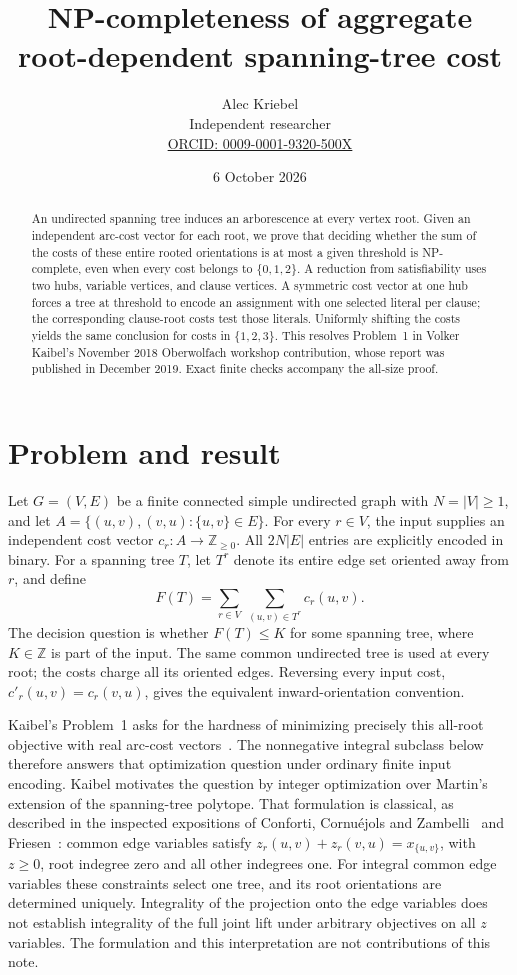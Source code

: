 \documentclass[11pt]{article}
\title{NP-completeness of aggregate root-dependent spanning-tree cost}
\author{Alec Kriebel\\Independent researcher\\
\small\href{https://orcid.org/0009-0001-9320-500X}{ORCID: 0009-0001-9320-500X}}
\date{6 October 2026}
\begin{document}
\maketitle
\begin{abstract}
An undirected spanning tree induces an arborescence at every vertex root.
Given an independent arc-cost vector for each root, we prove that deciding
whether the sum of the costs of these entire rooted orientations is at most
a given threshold is NP-complete, even when every cost belongs to
$\{0,1,2\}$. A reduction from satisfiability uses two hubs, variable vertices,
and clause vertices. A symmetric cost vector at one hub forces a tree at
threshold to encode an assignment with one selected literal per clause;
the corresponding clause-root costs test those literals. Uniformly shifting
the costs yields the same conclusion for costs in $\{1,2,3\}$. This resolves
Problem~1 in Volker Kaibel's November 2018 Oberwolfach workshop contribution,
whose report was published in December 2019. Exact finite checks accompany
the all-size proof.
\end{abstract}

\section{Problem and result}
Let $G=(V,E)$ be a finite connected simple undirected graph with
$N=|V|\geq 1$, and let
$A=\{(u,v),(v,u):\{u,v\}\in E\}$. For every $r\in V$, the input supplies
an independent cost vector $c_r:A\to\mathbb Z_{\geq0}$. All
$2N|E|$ entries are explicitly encoded in binary. For a spanning tree $T$,
let $T^r$ denote its entire edge set oriented away from $r$, and define
\begin{equation}\label{eq:objective}
 F(T)=\sum_{r\in V}\ \sum_{(u,v)\in T^r}c_r(u,v).
\end{equation}
The decision question is whether $F(T)\leq K$ for some spanning tree, where
$K\in\mathbb Z$ is part of the input. The same common undirected tree
is used at every root; the costs charge all its oriented edges.
Reversing every input cost, $c'_r(u,v)=c_r(v,u)$, gives the equivalent
inward-orientation convention.

Kaibel's Problem~1 asks for the hardness of minimizing precisely this
all-root objective with real arc-cost vectors~\cite{kaibel}. The
nonnegative integral subclass below therefore answers that optimization
question under ordinary finite input encoding. Kaibel motivates the question
by integer optimization over Martin's extension of the spanning-tree
polytope. That formulation is classical, as described in the inspected
expositions of Conforti, Cornu\'ejols and Zambelli~\cite[Section~6.1]{ccz}
and Friesen~\cite[Proposition~2]{friesen}: common edge variables satisfy
$z_r(u,v)+z_r(v,u)=x_{\{u,v\}}$, with $z\geq0$, root indegree zero and all
other indegrees one. For integral common edge variables these constraints select
one tree, and its root orientations are determined uniquely. Integrality
of the projection onto the edge variables does not establish integrality
of the full joint lift under arbitrary objectives on all $z$ variables.
The formulation and this interpretation are not contributions of this note.
\end{document}
